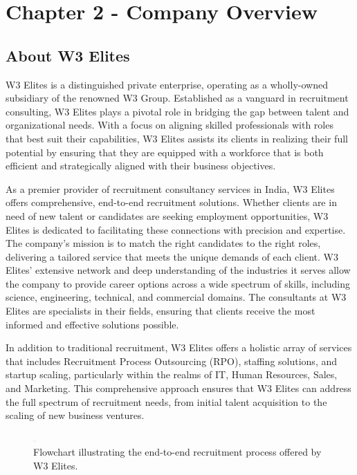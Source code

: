 \section{Chapter 2 - Company Overview}
\subsection{About W3 Elites}

W3 Elites is a distinguished private enterprise, operating as a wholly-owned subsidiary of the renowned W3 Group. Established as a vanguard in recruitment consulting, W3 Elites plays a pivotal role in bridging the gap between talent and organizational needs. With a focus on aligning skilled professionals with roles that best suit their capabilities, W3 Elites assists its clients in realizing their full potential by ensuring that they are equipped with a workforce that is both efficient and strategically aligned with their business objectives.

As a premier provider of recruitment consultancy services in India, W3 Elites offers comprehensive, end-to-end recruitment solutions. Whether clients are in need of new talent or candidates are seeking employment opportunities, W3 Elites is dedicated to facilitating these connections with precision and expertise. The company’s mission is to match the right candidates to the right roles, delivering a tailored service that meets the unique demands of each client. W3 Elites’ extensive network and deep understanding of the industries it serves allow the company to provide career options across a wide spectrum of skills, including science, engineering, technical, and commercial domains. The consultants at W3 Elites are specialists in their fields, ensuring that clients receive the most informed and effective solutions possible.

In addition to traditional recruitment, W3 Elites offers a holistic array of services that includes Recruitment Process Outsourcing (RPO), staffing solutions, and startup scaling, particularly within the realms of IT, Human Resources, Sales, and Marketing. This comprehensive approach ensures that W3 Elites can address the full spectrum of recruitment needs, from initial talent acquisition to the scaling of new business ventures.

\begin{figure}[ht]
    \centering
    \includegraphics[width=0.1cm]{assets/w3elites-end-to-end.png}
    \caption{Flowchart illustrating the end-to-end recruitment process offered by W3 Elites.}
    \label{fig:recruitment_process}
\end{figure}

